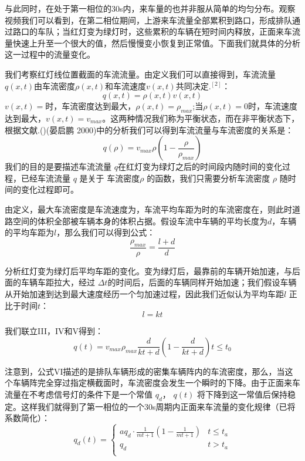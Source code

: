 \documentclass{cumcmart}
\begin{document}
与此同时，在处于第一相位的30s内，来车量的也并非服从简单的均匀分布。观察视频我们可以看到，在第二相位期间，上游来车流量全部累积到路口，形成排队通过路口的车队；当红灯变为绿灯时，这些累积的车辆在短时间内释放，正面来车流量快速上升至一个很大的值，然后慢慢变小恢复到正常值。下面我们就具体的分析这一过程中的流量变化。

我们考察红灯线位置截面的车流流量。由定义我们可以直接得到，车流流量$q\left(x, t\right)$由车流密度$\rho \left(x, t\right)$和车流速度$v(x, t)$共同决定.$^{[2]}$：
\[
q\left( x,t \right)=\rho \left( x,t \right)v\left( x,t \right)
\]
$v\left( x,t \right)=$时，车流密度达到最大，$\rho \left( x,t
\right) {=}\rho_{max}$;当$\rho \left( x,t
\right) {=0}$时，车流速度达到最大，$v\left( x,t
\right)=v_{max}$。这两种情况我们称为平衡状态，而在非平衡状态下，根据文献.()(晏启鹏
2000)中的分析我们可以得到车流流量与车流密度的关系是：
\begin{equation}
q\left( \rho \right)=v_{max}\rho \left( 1-\frac{\rho }{\rho_{max}} \right)
\end{equation}
我们的目的是要描述车流流量 $ { }q $在红灯变为绿灯之后的时间段内随时间的变化过程，已经车流流量
$q$ 是关于 车流密度$ \rho $ 的函数，我们只需要分析车流密度 $\rho $
随时间的变化过程即可。

由定义，最大车流密度是车流速度为，车流平均车距为时的车流密度在，则此时道路空间的体积全部被车辆本身的体积占据。假设车流中车辆的平均长度为$d$，车辆的平均车距为$l$，那么我们可以得到公式：
\begin{equation}
\frac{\rho_{max}}{\rho }=\frac{l+d}{d}
\end{equation}

分析红灯变为绿灯后平均车距的变化。变为绿灯后，最靠前的车辆开始加速，与后面的车辆车距拉大，经过 \quad $\Delta
t $的时间后，后面的车辆同样开始加速；我们假设车辆从开始加速到达到最大速度经历一个匀加速过程，因此我们近似认为平均车距$l$ 正比于时间$t$：
\begin{equation}
l=kt
\end{equation}

我们联立III，IV和V得到：
\begin{equation}
q\left( t \right)=v_{max}\rho_{max}\frac{d}{kt+d}(1-\frac{d}{kt+d}) t\leq
t_{0}\end{equation}

注意到，公式VI描述的是排队车辆形成的密集车辆阵内的车流密度，那么，当这个车辆阵完全穿过指定横截面时，车流密度会发生一个瞬时的下降。由于正面来车流量在不考虑信号灯的条件下是一个常值
$q_{d}$， $q(t)$
将下降到这一常值后保持稳定。这样我们就得到了第一相位的一个30s周期内正面来车流量的变化规律（已将系数简化）：
\begin{equation}
q_{d}\left( t \right)=\begin{cases}
aq_{d}\cdot \frac{1}{mt+1}(1-\frac{1}{mt+1}) &t\leq t_{a}\\
{q}_{d} &t>t_{a} \\
\end{cases}
\end{equation}
\end{document}
